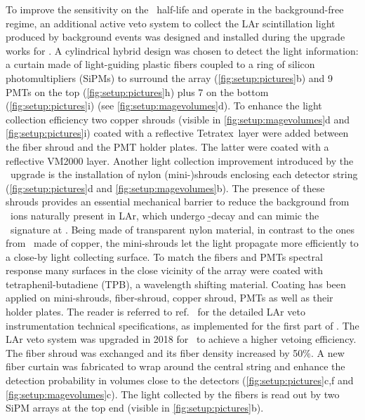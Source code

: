 To improve the sensitivity on the \onbb\ half-life and operate in the background-free
regime, an additional active veto system to collect the LAr scintillation light produced
by background events was designed and installed during the upgrade works for \phasetwo. A
cylindrical hybrid design was chosen to detect the light information: a curtain made of
light-guiding plastic fibers coupled to a ring of silicon photomultipliers (SiPMs) to
surround the array (\cref{fig:setup:pictures}b) and 9 PMTs on the top
(\cref{fig:setup:pictures}h) plus 7 on the bottom (\cref{fig:setup:pictures}i) (see
\cref{fig:setup:magevolumes}d). To enhance the light collection efficiency two copper
shrouds (visible in \cref{fig:setup:magevolumes}d and \cref{fig:setup:pictures}i) coated
with a reflective Tetratex\reg\ layer were added between the fiber shroud and the PMT
holder plates. The latter were coated with a reflective VM2000 layer. Another light
collection improvement introduced by the \phasetwo\ upgrade is the installation of nylon
(mini-)shrouds enclosing each detector string (\cref{fig:setup:pictures}d and
\cref{fig:setup:magevolumes}b). The presence of these shrouds provides an essential
mechanical barrier to reduce the background from \kvz\ ions naturally present in LAr,
which undergo \b-decay and can mimic the \onbb\ signature at \qbb. Being made of
transparent nylon material, in contrast to the ones from \phaseone\ made of copper, the
mini-shrouds let the light propagate more efficiently to a close-by light collecting
surface. To match the fibers and PMTs spectral response many surfaces in the close
vicinity of the array were coated with tetraphenil-butadiene (TPB), a wavelength shifting
material.  Coating has been applied on mini-shrouds, fiber-shroud, copper shroud, PMTs as
well as their holder plates. The reader is referred to ref.~\cite{Agostini2018a} for the
detailed LAr veto instrumentation technical specifications, as implemented for the first
part of
\phasetwo.
\newpar
The LAr veto system was upgraded in 2018 for \phasetwop\ to achieve a higher vetoing
efficiency. The fiber shroud was exchanged and its fiber density increased by 50\%. A new
fiber curtain was fabricated to wrap around the central string and enhance the detection
probability in volumes close to the detectors (\cref{fig:setup:pictures}c,f and
\cref{fig:setup:magevolumes}c). The light collected by the fibers is read out by two SiPM
arrays at the top end (visible in \cref{fig:setup:pictures}b).

